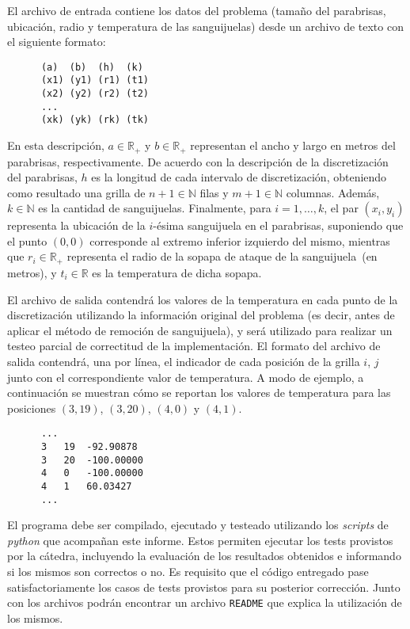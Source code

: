 \documentclass[11pt, a4paper]{article}
\newcommand{\real}{\mathbb{R}}
\newcommand{\nat}{\mathbb{N}}
\newcommand{\atacante}{sanguijuela}
\newcommand{\objeto}{parabrisas}
\begin{document}
El archivo de entrada contiene los datos del problema (tama\~no del \objeto, ubicaci\'on, radio y temperatura de las \atacante s) desde un archivo de texto con el siguiente formato:

\begin{verbatim}
      (a)  (b)  (h)  (k)
      (x1) (y1) (r1) (t1)
      (x2) (y2) (r2) (t2)
      ...
      (xk) (yk) (rk) (tk)
\end{verbatim}

En esta descripci\'on, $a\in\real_+$ y $b\in\real_+$ representan el ancho
y largo en metros del \objeto, respectivamente. De acuerdo con la descripci\'on
de la discretizaci\'on del \objeto, $h$ es la longitud de cada intervalo de discretizaci\'on,
obteniendo como resultado una grilla de $n+1\in\nat$ filas y $m+1\in\nat$ columnas. Adem\'as, $k\in\nat$ es la cantidad de \atacante s.
Finalmente, para $i=1,\dots,k$, el par $(x_i,y_i)$ representa la ubicaci\'on de la $i$-\'esima sanguijuela en el \objeto, suponiendo que el punto $(0,0)$  corresponde al extremo inferior izquierdo del mismo, mientras que $r_i\in\real_+$ representa el radio de la sopapa de ataque de la \atacante\ (en metros), y $t_i\in\real$ es la temperatura de dicha sopapa.

El archivo de salida contendr\'a los valores de la temperatura en cada punto de la discretizaci\'on utilizando la informaci\'on original del problema (es decir, antes de aplicar el m\'etodo de remoci\'on de \atacante), y ser\'a utilizado para realizar un testeo parcial de correctitud de la implementaci\'on. El formato del archivo de salida contendr\'a, una por l\'inea, el indicador de cada posici\'on de la grilla $i$, $j$ junto con el correspondiente valor de temperatura. A modo de ejemplo, a continuaci\'on se muestran c\'omo se reportan los valores de temperatura para las posiciones $(3,19)$, $(3,20)$, $(4,0)$ y $(4,1)$. 

\begin{verbatim}
      ...
      3   19  -92.90878
      3   20  -100.00000
      4   0   -100.00000
      4   1   60.03427
      ...
\end{verbatim}

El programa debe ser compilado, ejecutado y testeado utilizando los \emph{scripts} de \emph{python} que acompa\~nan este informe. Estos permiten ejecutar los tests provistos por la c\'atedra, incluyendo la evaluaci\'on de los resultados obtenidos e informando si los mismos son correctos o no. Es requisito que el c\'odigo entregado pase satisfactoriamente los casos de tests provistos para su posterior correcci\'on. Junto con los archivos podr\'an encontrar un archivo \texttt{README} que explica la utilizaci\'on de los mismos.
\end{document}
